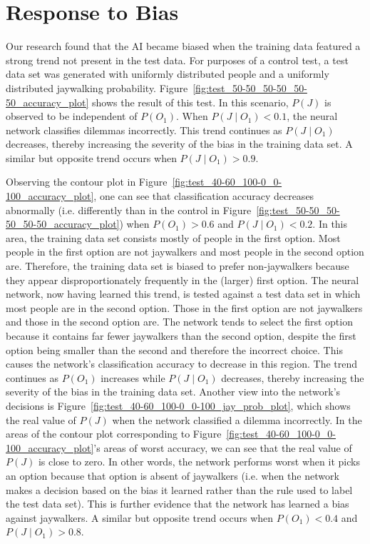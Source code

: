 \documentclass{report}
\begin{document}
\section{Response to Bias}

Our research found that the AI became biased when the training data featured a strong trend not
present in the test data. For purposes of a control test, a test data set was generated with
uniformly distributed people and a uniformly distributed jaywalking probability.
Figure~\ref{fig:test_50-50_50-50_50-50_accuracy_plot} shows the result of this test. In this
scenario, $P(J)$ is observed to be independent of $P(O_1)$. When $P(J \mid O_1) < 0.1$, the neural
network classifies dilemmas incorrectly. This trend continues as $P(J \mid O_1)$ decreases, thereby
increasing the severity of the bias in the training data set. A similar but opposite trend occurs
when $P(J \mid O_1) > 0.9$.

Observing the contour plot in Figure~\ref{fig:test_40-60_100-0_0-100_accuracy_plot}, one can see
that classification accuracy decreases abnormally (i.e. differently than in the control in
Figure~\ref{fig:test_50-50_50-50_50-50_accuracy_plot}) when $P(O_1) > 0.6$ and $P(J \mid O_1) <
0.2$. In this area, the training data set consists mostly of people in the first option. Most people
in the first option are not jaywalkers and most people in the second option are. Therefore, the
training data set is biased to prefer non-jaywalkers because they appear disproportionately
frequently in the (larger) first option. The neural network, now having learned this trend, is
tested against a test data set in which most people are in the second option. Those in the first
option are not jaywalkers and those in the second option are. The network tends to select the first
option because it contains far fewer jaywalkers than the second option, despite the first option
being smaller than the second and therefore the incorrect choice. This causes the network's
classification accuracy to decrease in this region. The trend continues as $P(O_1)$ increases while
$P(J \mid O_1)$ decreases, thereby increasing the severity of the bias in the training data set.
Another view into the network's decisions is Figure~\ref{fig:test_40-60_100-0_0-100_jay_prob_plot},
which shows the real value of $P(J)$ when the network classified a dilemma incorrectly. In the areas
of the contour plot corresponding to Figure~\ref{fig:test_40-60_100-0_0-100_accuracy_plot}'s areas
of worst accuracy, we can see that the real value of $P(J)$ is close to zero. In other words, the
network performs worst when it picks an option because that option is absent of jaywalkers (i.e.
when the network makes a decision based on the bias it learned rather than the rule used to label
the test data set). This is further evidence that the network has learned a bias against jaywalkers.
A similar but opposite trend occurs when $P(O_1) < 0.4$ and $P(J \mid O_1) > 0.8$.
\end{document}
